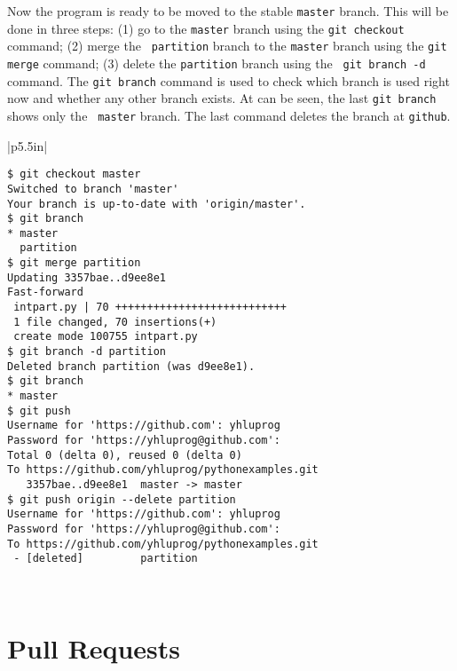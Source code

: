 \resetlinenumber[1]
\linenumbers
\begin{tt}
  
\end{tt}
\nolinenumbers


  
Now the program is ready to be moved to the stable {\tt master}
branch.  This will be done in three steps: (1) go to the {\tt master}
branch using the {\tt git checkout} command; (2) merge the {\tt
  partition} branch to the {\tt master} branch using the {\tt git
  merge} command; (3) delete the {\tt partition} branch using the {\tt
  git branch -d} command.  The {\tt git branch} command is used to
check which branch is used right now and whether any other branch
exists.  At can be seen, the last {\tt git branch} shows only the {\tt
  master} branch.  The last command deletes the branch at {\tt github}.

\vspace{0.2in}
\noindent
\begin{tabular}{|p{5.5in}|}\hline
\begin{verbatim}
$ git checkout master
Switched to branch 'master'
Your branch is up-to-date with 'origin/master'.
$ git branch
* master
  partition
$ git merge partition
Updating 3357bae..d9ee8e1
Fast-forward
 intpart.py | 70 +++++++++++++++++++++++++++
 1 file changed, 70 insertions(+)
 create mode 100755 intpart.py
$ git branch -d partition
Deleted branch partition (was d9ee8e1).
$ git branch
* master
$ git push
Username for 'https://github.com': yhluprog
Password for 'https://yhluprog@github.com': 
Total 0 (delta 0), reused 0 (delta 0)
To https://github.com/yhluprog/pythonexamples.git
   3357bae..d9ee8e1  master -> master
$ git push origin --delete partition
Username for 'https://github.com': yhluprog
Password for 'https://yhluprog@github.com': 
To https://github.com/yhluprog/pythonexamples.git
 - [deleted]         partition
\end{verbatim}
\\ \hline
\end{tabular}
\vspace{0.2in}

\clearpage

\section{Pull Requests}

